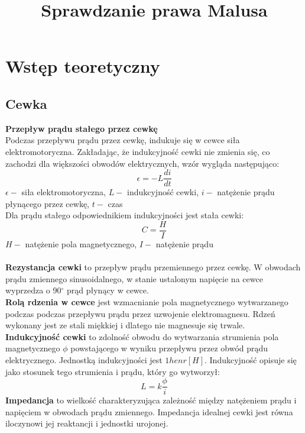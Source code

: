 \documentclass{article}
\begin{document}
\title{\huge\bfseries Sprawdzanie prawa Malusa}
\date{}
\author{}
\maketitle
\section{Wstęp teoretyczny}
\subsection{Cewka}
\textbf{Przepływ prądu stałego przez cewkę}\\
Podczas przepływu prądu przez cewkę, indukuje się w cewce siła elektromotoryczna. Zakładając, że indukcyjność cewki nie zmienia się, co zachodzi dla większości obwodów elektrycznych, wzór  wygląda następująco:
$$\epsilon = -L \frac{di}{dt}$$
$\epsilon - $ siła elektromotoryczna, $L - $ indukcyjność cewki, $i - $ natężenie prądu płynącego przez cewkę, $t - $ czas\\
Dla prądu stałego odpowiednikiem indukcyjności jest stała cewki:
$$C = \frac{H}{I}$$
$H-$ natężenie pola magnetycznego, $I-$ natężenie prądu\\\\
\textbf{Rezystancja cewki} to przepływ prądu przemiennego przez cewkę.
W obwodach prądu zmiennego sinusoidalnego, w stanie ustalonym napięcie na cewce wyprzedza o 90$^\circ$ prąd płynący w cewce.\\
\textbf{Rolą rdzenia w cewce} jest wzmacnianie pola magnetycznego wytwarzanego podczas podczas przepływu prądu przez uzwojenie elektromagnesu. Rdzeń wykonany jest ze stali miękkiej i dlatego nie magnesuje się trwale.\\
\textbf{Indukcyjność cewki} to zdolność obwodu do wytwarzania strumienia pola magnetycznego $\phi$ powstającego w wyniku przepływu przez obwód prądu elektrycznego. Jednostką indukcyjności jest $1 henr[H]$. Indukcyjność opisuje się jako stosunek tego strumienia i prądu, który go wytworzył:
$$L = k\frac{\phi}{i}$$
\textbf{Impedancja} to wielkość charakteryzująca zależność między natężeniem prądu i napięciem w obwodach prądu zmiennego. Impedancja idealnej cewki jest równa iloczynowi jej reaktancji i jednostki urojonej.
\end{document}
